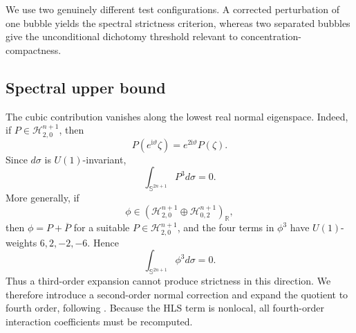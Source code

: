 \documentclass[11pt]{article}
\begin{document}
We use two genuinely different test configurations. A corrected perturbation of one bubble yields the spectral strictness criterion, whereas two separated bubbles give the unconditional dichotomy threshold relevant to concentration-compactness.



\begingroup
\subsection{Spectral upper bound}\label{sec41}
\begingroup
The cubic contribution vanishes along the lowest real normal eigenspace. Indeed, if \(P\in\mathcal H_{2,0}^{n+1}\), then
\[
P(e^{\mathrm i\vartheta}\zeta)=e^{2\mathrm i\vartheta}P(\zeta).
\]
Since \(d\sigma\) is \(U(1)\)-invariant,
\[
\int_{\mathbb S^{2n+1}}P^3d\sigma=0.
\]
More generally, if
\[
\phi\in(\mathcal H_{2,0}^{n+1}\oplus\mathcal H_{0,2}^{n+1})_{\mathbb R},
\]
then \(\phi=P+\overline P\) for a suitable \(P\in\mathcal H_{2,0}^{n+1}\), and the four terms in \(\phi^3\) have \(U(1)\)-weights \(6,2,-2,-6\). Hence
\[
\int_{\mathbb S^{2n+1}}\phi^3d\sigma=0.
\]
Thus a third-order expansion cannot produce strictness in this direction. We therefore introduce a second-order normal correction and expand the quotient to fourth order, following \cite[Proposition~6.4]{Li26}. Because the HLS term is nonlocal, all fourth-order interaction coefficients must be recomputed.
\endgroup
\end{document}
